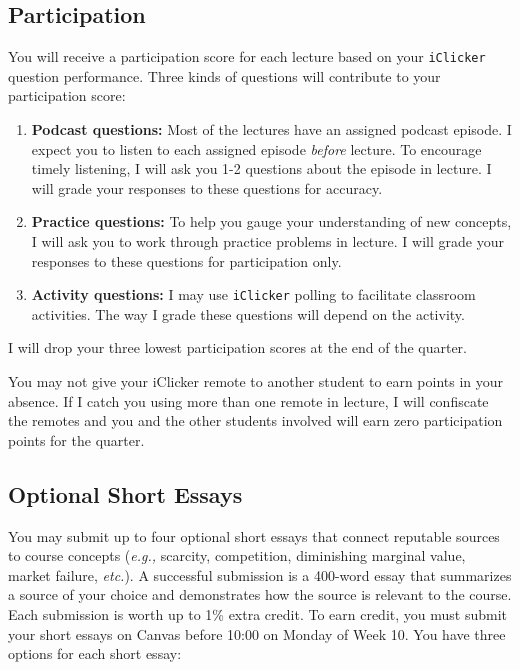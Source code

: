 \documentclass[11pt]{article}
\begin{document}
\subsection*{Participation} 

You will receive a participation score for each lecture based on your \texttt{iClicker} question performance. Three kinds of questions will contribute to your participation score:

\begin{enumerate}
	\setlength{\itemsep}{0pt}
	\item \textbf{Podcast questions:} Most of the lectures have an assigned podcast episode. I expect you to listen to each assigned episode \textit{before} lecture. To encourage timely listening, I will ask you 1-2 questions about the episode in lecture. I will grade your responses to these questions for accuracy.
	\item \textbf{Practice questions:} To help you gauge your understanding of new concepts, I will ask you to work through practice problems in lecture. I will grade your responses to these questions for participation only.
	\item \textbf{Activity questions:} I may use \texttt{iClicker} polling to facilitate classroom activities. The way I grade these questions will depend on the activity.
\end{enumerate}

\noindent I will drop your three lowest participation scores at the end of the quarter.

You may not give your iClicker remote to another student to earn points in your absence. If I catch you using more than one remote in lecture, I will confiscate the remotes and you and the other students involved will earn zero participation points for the quarter. 

\subsection*{Optional Short Essays}

You may submit up to four optional short essays that connect reputable sources to course concepts (\textit{e.g.,} scarcity, competition, diminishing marginal value, market failure, \textit{etc.}). A successful submission is a 400-word essay that summarizes a source of your choice and demonstrates how the source is relevant to the course. Each submission is worth up to 1\% extra credit. To earn credit, you must submit your short essays on Canvas before 10:00 on Monday of Week 10. You have three options for each short essay:
\end{document}
